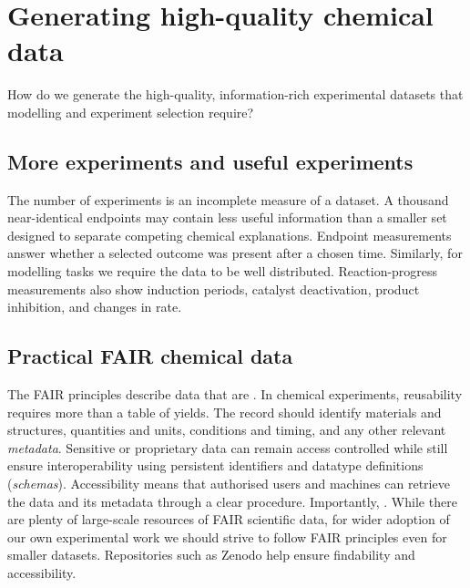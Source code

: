 
\chapter{Generating high-quality chemical data}

\begin{notebox}
   How do we generate the high-quality, information-rich experimental datasets that modelling and experiment selection require?
\end{notebox}

\section{More experiments and useful experiments}

The number of experiments is an incomplete measure of a dataset.
A thousand near-identical endpoints may contain less useful information than a smaller set designed to separate competing chemical explanations.
Endpoint measurements answer whether a selected outcome was present after a chosen time.
Similarly, for modelling tasks we require the data to be well distributed.
Reaction-progress measurements also show induction periods, catalyst deactivation, product inhibition, and changes in rate.


\section{Practical FAIR chemical data}

The FAIR principles describe data that are .
In chemical experiments, reusability requires more than a table of yields.
The record should identify materials and structures, quantities and units, conditions and timing, and any other relevant \textit{metadata}.
Sensitive or proprietary data can remain access controlled while still ensure interoperability using persistent identifiers and datatype definitions (\textit{schemas}).
Accessibility means that authorised users and machines can retrieve the data and its metadata through a clear procedure.
Importantly, .
While there are plenty of large-scale resources of FAIR scientific data, for wider adoption of our own experimental work we should strive to follow FAIR principles even for smaller datasets.
Repositories such as Zenodo help ensure findability and accessibility.

